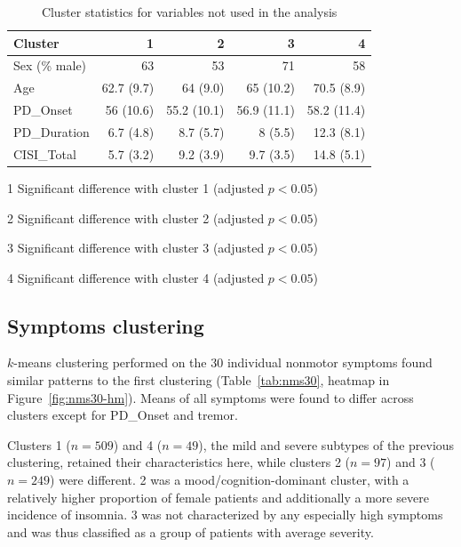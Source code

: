 \documentclass[preprint,5p]{elsarticle} %
\begin{document}
\begin{table}[t]
  \centering
  \caption{Cluster statistics for variables not used in the analysis}
  \label{tab:nmd_extra}
  \begin{threeparttable}
  \begin{tabular}{l r r r r}
    \toprule
    Cluster & 1 & 2 & 3 & 4 \\
    \midrule
      Sex (\% male) & 63 & 53\tnote{3} & 71\tnote{2} & 58 \\
      Age & 62.7 (9.7)\tnote{34} & 64 (9.0)\tnote{4} & 65 (10.2)\tnote{14} & 70.5 (8.9)\tnote{123} \\
      PD\_Onset & 56 (10.6) & 55.2 (10.1) & 56.9 (11.1) & 58.2 (11.4) \\
      PD\_Duration & 6.7 (4.8)\tnote{234} & 8.7 (5.7)\tnote{14} & 8 (5.5)\tnote{14} & 12.3
      (8.1)\tnote{123} \\
      CISI\_Total & 5.7 (3.2)\tnote{234} & 9.2 (3.9)\tnote{14} & 9.7 (3.5)\tnote{14} & 14.8
      (5.1)\tnote{123} \\
    \bottomrule
  \end{tabular}
  \begin{tablenotes}
    \small
    \item[1] Significant difference with cluster 1 (adjusted $p < 0.05$)
    \item[2] Significant difference with cluster 2 (adjusted $p < 0.05$)
    \item[3] Significant difference with cluster 3 (adjusted $p < 0.05$)
    \item[4] Significant difference with cluster 4 (adjusted $p < 0.05$)
  \end{tablenotes}
  \end{threeparttable}
\end{table}

\subsection{Symptoms clustering}

$k$-means clustering performed on the 30 individual nonmotor symptoms found similar patterns to the
first clustering (Table~\ref{tab:nms30}, heatmap in Figure~\ref{fig:nms30-hm}). Means of all
symptoms were found to differ across clusters except for PD\_Onset and tremor.

Clusters 1 ($n = 509$) and 4 ($n = 49$), the mild and severe subtypes of the previous clustering,
retained their characteristics here, while clusters 2 ($n = 97$) and 3 ($n = 249$) were different.
2 was a mood/cognition-dominant cluster, with a relatively higher proportion of female patients and
additionally a more severe incidence of insomnia. 3 was not characterized by any especially high
symptoms and was thus classified as a group of patients with average severity.
\end{document}

